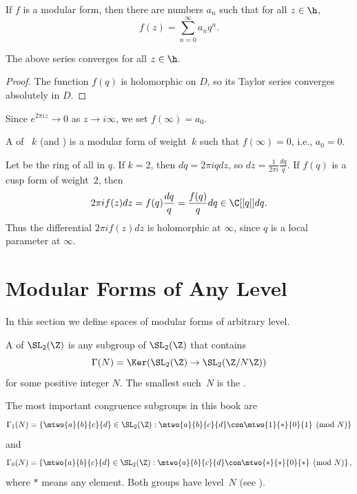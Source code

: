 If $f$ is a modular form, then  there are numbers
$a_n$ such that for all $z\in \h$, 
\begin{equation}\label{eqn:qexp1}
f(z) = \sum_{n=0}^{\infty} a_n q^n.
\end{equation}
\begin{proposition}
The above series converges for all $z\in\h$.
\end{proposition}
\begin{proof}
The function $f(q)$ is holomorphic on $D$, so 
its Taylor series converges absolutely
in $D$.  
\end{proof}

Since $e^{2\pi i z}\to 0$ as  $z\to i \infty$, 
we set $f(\infty)=a_0$.


\begin{definition}
  A  of ~$k$ (and ) is a
  modular form of weight~$k$ such that $f(\infty)=0$, i.e., $a_0=0$.
\end{definition}

Let \sym{\C[[q]]}
be the ring of all  
in $q$. 
If $k=2$, then $dq = 2\pi i q dz$, 
so $dz = \frac{1}{2\pi i}\frac{dq}{q}$.
If $f(q)$ is a cusp form of weight~$2$, then 
$$
  2\pi i f(z) dz 
     = f(q) \frac{dq}{q}  = \frac{f(q)}{q} dq \in \C[[q]] dq.
$$
Thus the differential $2\pi i f(z) dz$ is holomorphic at $\infty$,
since $q$ is a local parameter at $\infty$.

\section{Modular Forms of Any Level}\label{sec:modformN}
In this section we define spaces of modular forms of arbitrary level.  

\begin{definition}
A  of
$\SL_2(\Z)$ is any subgroup of $\SL_2(\Z)$ that contains
$$\Gamma(N) = \Ker(\SL_2(\Z)\to \SL_2(\Z/N\Z))$$
for some positive integer $N$.  The smallest such~$N$ is the
.
\end{definition}
The most important congruence
subgroups in this book are
$$
  \Gamma_1(N) = \left\{ \mtwo{a}{b}{c}{d} \in \SL_2(\Z) : 
                    \mtwo{a}{b}{c}{d}\con \mtwo{1}{*}{0}{1}\pmod{N}
                \right\}
$$
and
$$
  \Gamma_0(N) = \left\{ \mtwo{a}{b}{c}{d} \in \SL_2(\Z) : 
                    \mtwo{a}{b}{c}{d}\con \mtwo{*}{*}{0}{*}\pmod{N}
                \right\},
$$
where $*$ means any element.  Both  groups have level~$N$ (see
).

